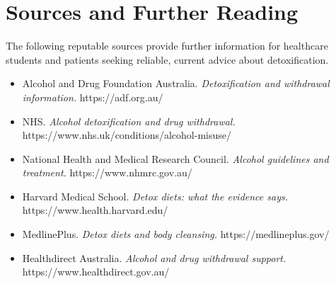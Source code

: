 \section*{Sources and Further Reading}
The following reputable sources provide further information for healthcare students and patients seeking reliable, current advice about detoxification.

\begin{itemize}
    \item Alcohol and Drug Foundation Australia. \textit{Detoxification and withdrawal information.} https://adf.org.au/
    \item NHS. \textit{Alcohol detoxification and drug withdrawal.} https://www.nhs.uk/conditions/alcohol-misuse/
    \item National Health and Medical Research Council. \textit{Alcohol guidelines and treatment.} https://www.nhmrc.gov.au/
    \item Harvard Medical School. \textit{Detox diets: what the evidence says.} https://www.health.harvard.edu/
    \item MedlinePlus. \textit{Detox diets and body cleansing.} https://medlineplus.gov/
    \item Healthdirect Australia. \textit{Alcohol and drug withdrawal support.} https://www.healthdirect.gov.au/
\end{itemize}

